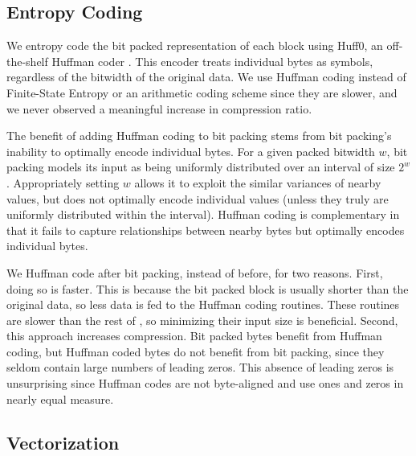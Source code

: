 \subsection{Entropy Coding}

We entropy code the bit packed representation of each block using Huff0, an off-the-shelf Huffman coder \cite{fse}. This encoder treats individual bytes as symbols, regardless of the bitwidth of the original data. We use Huffman coding instead of Finite-State Entropy \cite{fse} or an arithmetic coding scheme since they are slower, and we never observed a meaningful increase in compression ratio.

The benefit of adding Huffman coding to bit packing stems from bit packing's inability to optimally encode individual bytes. For a given packed bitwidth $w$, bit packing models its input as being uniformly distributed over an interval of size $2^{w}$. Appropriately setting $w$ allows it to exploit the similar variances of nearby values, but does not optimally encode individual values (unless they truly are uniformly distributed within the interval). Huffman coding is complementary in that  it fails to capture relationships between nearby bytes but optimally encodes individual bytes.

We Huffman code after bit packing, instead of before, for two reasons. First, doing so is faster. This is because the bit packed block is usually shorter than the original data, so less data is fed to the Huffman coding routines. These routines are slower than the rest of \mine, so minimizing their input size is beneficial. Second, this approach increases compression. Bit packed bytes benefit from Huffman coding, but Huffman coded bytes do not benefit from bit packing, since they seldom contain large numbers of leading zeros. This absence of leading zeros is unsurprising since Huffman codes are not byte-aligned and use ones and zeros in nearly equal measure.




\subsection{Vectorization}

